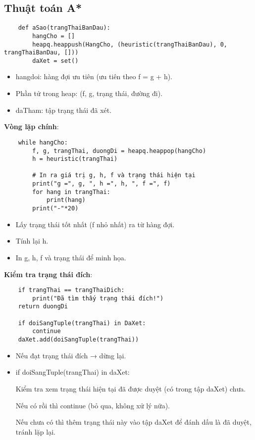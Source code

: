 \documentclass{article}
\begin{document}
\subsection{Thuật toán A*}
\begin{verbatim}
    def aSao(trangThaiBanDau):
        hangCho = []
        heapq.heappush(HangCho, (heuristic(trangThaiBanDau), 0, trangThaiBanDau, []))
        daXet = set()
\end{verbatim}
\begin{itemize}
    \item hangdoi: hàng đợi ưu tiên (ưu tiên theo f = g + h).
    \item Phần tử trong heap: (f, g, trạng thái, đường đi).
    \item daTham: tập trạng thái đã xét.

\end{itemize}
\textbf{Vòng lặp chính}:
\begin{verbatim}
    while hangCho:
        f, g, trangThai, duongDi = heapq.heappop(hangCho)
        h = heuristic(trangThai)

        # In ra giá trị g, h, f và trạng thái hiện tại
        print("g =", g, ", h =", h, ", f =", f)
        for hang in trangThai:
            print(hang)
        print("-"*20)
\end{verbatim}
\begin{itemize}
    \item Lấy trạng thái tốt nhất (f nhỏ nhất) ra từ hàng đợi.
    \item Tính lại h.
    \item In g, h, f và trạng thái để minh họa.

\end{itemize}
\textbf{Kiểm tra trạng thái đích}:
\begin{verbatim}
    if trangThai == trangThaiDich:
        print("Đã tìm thấy trạng thái đích!")
    return duongDi

    if doiSangTuple(trangThai) in DaXet:
        continue
    daXet.add(doiSangTuple(trangThai))
\end{verbatim}
\begin{itemize}
    \item Nếu đạt trạng thái đích → dừng lại.
 \item if doiSangTuple(trangThai) in daXet:
 
 Kiểm tra xem trạng thái hiện tại đã được duyệt (có trong tập daXet) chưa.


 Nếu có rồi thì continue (bỏ qua, không xử lý nữa).


 Nếu chưa có thì thêm trạng thái này vào tập daXet để đánh dấu là đã duyệt, tránh lặp lại.

\end{itemize}
\end{document}
